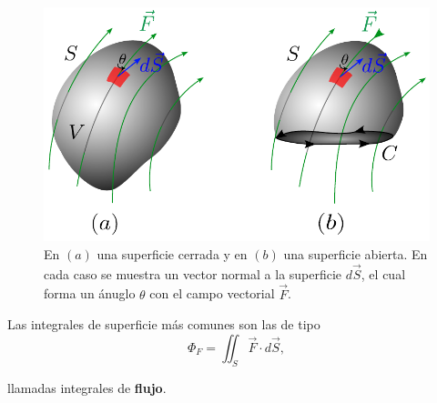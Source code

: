 \begin{figure}[H]
    \centering
    \includegraphics[scale = 0.8]{Figuras/ElementoSuperficie.pdf}
    \caption{En $(a)$ una superficie cerrada y en $(b)$ una superficie abierta. En cada caso se muestra un vector normal a la superficie $d\Vec{S}$, el cual forma un ánuglo $\theta$ con el campo vectorial $\Vec{F}$.}
    \label{fig:Superficies}
\end{figure}


Las integrales de superficie más comunes son las de tipo 
\begin{equation*}
\Phi_F = \iint_S \vec{F} \cdot d\vec{S},
\end{equation*}

llamadas integrales de \textbf{flujo}.

